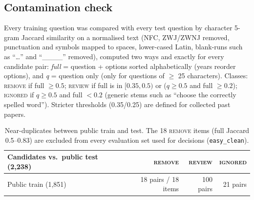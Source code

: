 \documentclass[10pt,a4paper]{article}
\begin{document}
\subsection{Contamination check}
Every training question was compared with every test question by character 5-gram Jaccard similarity on a
normalised text (NFC, ZWJ/ZWNJ removed, punctuation and symbols mapped to spaces, lower-cased Latin, blank-runs
such as ``\ldots'' and ``\_\_\_\_'' removed), computed two ways and exactly for every candidate pair:
\emph{full} = question + options sorted alphabetically (years reorder options), and \emph{q} = question only (only for
questions of $\ge$ 25 characters). Classes: \textsc{remove} if full $\ge 0.5$; \textsc{review} if full is in
$[0.35, 0.5)$ or ($q \ge 0.5$ and full $\ge 0.2$); \textsc{ignored} if $q \ge 0.5$ and full $< 0.2$ (generic stems
such as ``choose the correctly spelled word''). Stricter thresholds (0.35/0.25) are defined for collected past papers.

\begin{table}[h]
\centering\small
\begin{tabular}{lrrr}
\toprule
Candidates vs.\ public test (2,238) & \textsc{remove} & \textsc{review} & \textsc{ignored}\\
\midrule
Public train (1,851) & 18 pairs / 18 items & 100 pairs & 21 pairs\\
\bottomrule
\end{tabular}
\caption{Near-duplicates between public train and test. The 18 \textsc{remove} items (full Jaccard 0.5--0.83) are
excluded from every evaluation set used for decisions (\texttt{easy\_clean}).}
\end{table}
\end{document}

